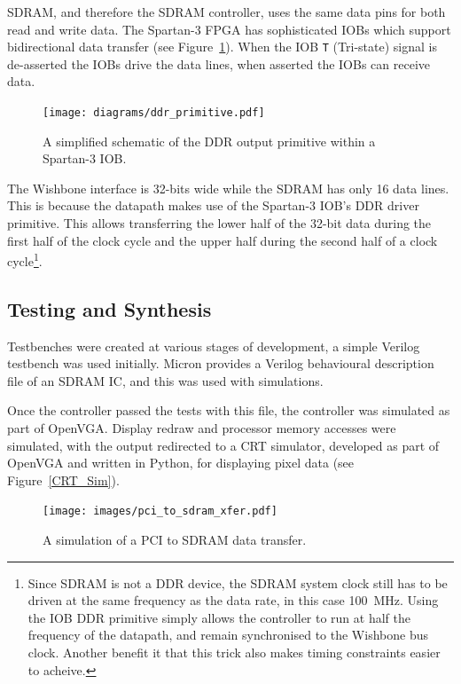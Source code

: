 SDRAM, and therefore the SDRAM controller, uses the same data pins for both read
and write data. The Spartan-3 FPGA has sophisticated IOBs which support
bidirectional data transfer (see Figure~\ref{MEM_DDR_IOB}). When the IOB
\texttt{T} (Tri-state) signal is de-asserted the IOBs drive the data lines, when
asserted the IOBs can receive data.

\begin{figure}[h!]
\begin{center}
\texttt{[image: diagrams/ddr\_primitive.pdf]}
\caption[Spartan-3 DDR IOB Primitive]{A simplified schematic of the DDR output
primitive within a Spartan-3 IOB\cite{Xilinx_SP3_DS}.}
\label{MEM_DDR_IOB}
\end{center}
\end{figure}

The Wishbone interface is 32-bits wide while the SDRAM has only 16 data lines.
This is because the datapath makes use of the Spartan-3 IOB's DDR driver
primitive. This allows transferring the lower half of the 32-bit data during the
first half of the clock cycle and the upper half during the second half of a
clock cycle\footnote{Since SDRAM is not a DDR device, the SDRAM system clock
still has to be driven at the same frequency as the data rate, in this case
100~MHz. Using the IOB DDR primitive simply allows the controller to run at half
the frequency of the datapath, and remain synchronised to the Wishbone bus clock.
Another benefit it that this trick also makes timing constraints easier to
acheive.}.


\subsection{Testing and Synthesis}
Testbenches were created at various stages of development, a simple Verilog
testbench was used initially. Micron provides a Verilog behavioural description
file of an SDRAM IC, and this was used with simulations.

Once the controller passed the tests with this file, the controller was simulated
as part of OpenVGA. Display redraw and processor memory accesses were simulated,
with the output redirected to a CRT simulator, developed as part of OpenVGA and
written in Python, for displaying pixel data (see Figure~\ref{CRT_Sim}).

\begin{figure}[h!]
\texttt{[image: images/pci\_to\_sdram\_xfer.pdf]}
\caption[A simulation of a PCI to SDRAM data transfer]{A simulation of a PCI to
SDRAM data transfer.}
\label{MEM_GtkWave_SDRAM}
\end{figure}

